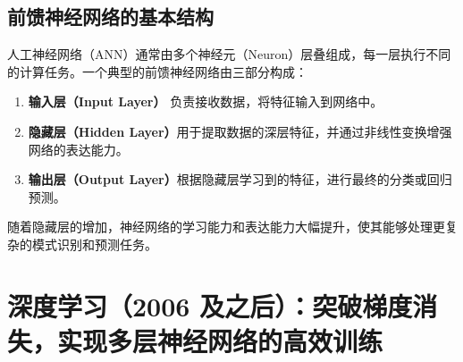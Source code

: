 \subsection{ 前馈神经网络的基本结构}
人工神经网络（ANN）通常由多个神经元（Neuron）层叠组成，每一层执行不同的计算任务。一个典型的前馈神经网络由三部分构成：
\begin{enumerate}
\item {\bf  输入层（Input Layer）} 负责接收数据，将特征输入到网络中。
\item {\bf  隐藏层（Hidden Layer）}用于提取数据的深层特征，并通过非线性变换增强网络的表达能力。
\item  {\bf  输出层（Output Layer）}根据隐藏层学习到的特征，进行最终的分类或回归预测。
\end{enumerate}
随着隐藏层的增加，神经网络的学习能力和表达能力大幅提升，使其能够处理更复杂的模式识别和预测任务。
\section{深度学习（2006 及之后）：突破梯度消失，实现多层神经网络的高效训练}

